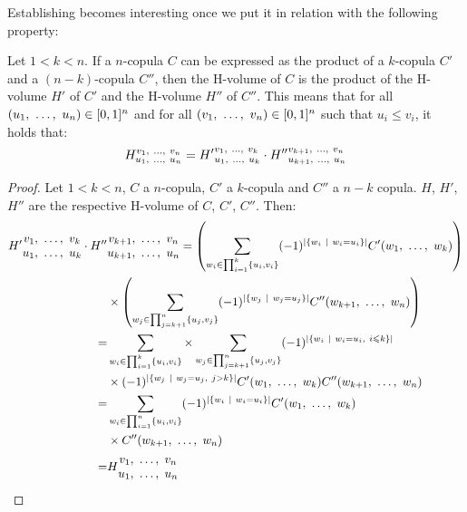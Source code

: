 Establishing  becomes interesting once we put it in relation with the following property:
\begin{proposition}\label{prop:hvol_factorizing}
    Let $1<k<n$. If a $n$-copula $C$ can be expressed as the product of a $k$-copula $C'$ and a $(n-k)$-copula $C''$, then the H-volume of $C$ is the product of the H-volume $H'$ of $C'$ and the H-volume $H''$ of $C''$. This means that for all $(u_1 , ~\ldots, ~ u_n)\in[0,1]^n$ and for all $(v_1 , ~\ldots, ~ v_n)\in[0,1]^n$ such that $u_i\leqslant v_i$, it holds that:
    \begin{align}
        H_{u_1 , ~\ldots, ~ u_n}^{v_1 , ~\ldots, ~ v_n} = {H'}_{u_1 , ~\ldots, ~ u_k}^{v_1 , ~\ldots, ~ v_k}\cdot{H''}_{u_{k+1} , ~\ldots, ~ u_n}^{v_{k+1} , ~\ldots, ~ v_n}
    \end{align}
\end{proposition}
\begin{proof}
    Let $1<k<n$, $C$ a $n$-copula, $C'$ a $k$-copula and $C''$ a $n-k$ copula. $H$, $H'$, $H''$ are the respective H-volume of $C$, $C'$, $C''$. Then:
    \begin{align*}
        {H'}
        \begin{matrix}
            v_1 , ~\ldots, ~  v_k\\
            u_1 , ~\ldots, ~  u_k
        \end{matrix}
        \cdot {H''}&
        \begin{matrix}
            v_{k+1} , ~\ldots, ~  v_n\\
            u_{k+1} , ~\ldots, ~  u_n
        \end{matrix}= \left(\sum_{w_i\in\prod_{i=1}^{k}\{u_i,v_i\}}(-1)^{|\{w_i~|~w_i=u_i\}|}C'(w_1 , ~\ldots, ~ w_k)\right)\\
        &\times\left(\sum_{w_j\in\prod_{j=k+1}^{n}\{u_j,v_j\}}(-1)^{|\{w_j~|~w_j=u_j\}|}C''(w_{k+1} , ~\ldots, ~ w_n)\right)\\
        =& \sum_{w_i\in\prod_{i=1}^{k}\{u_i,v_i\}}\times\sum_{w_j\in\prod_{j=k+1}^{n}\{u_j,v_j\}}(-1)^{|\{w_i~|~w_i=u_i,~i\leqslant k\}|}\\
        &\times(-1)^{|\{w_j~|~w_j=u_j,~ j>k\}|}C'(w_1 , ~\ldots, ~ w_k)C''(w_{k+1} , ~\ldots, ~ w_n)\\
        =&\sum_{w_i\in\prod_{i=1}^{n}\{u_i,v_i\}}(-1)^{|\{w_i~|~w_i=u_i\}|}C'(w_1 , ~\ldots, ~ w_k)\\
        &\times C''(w_{k+1} , ~\ldots, ~ w_n)\\
        =&H
        \begin{matrix}
            v_1 , ~\ldots, ~  v_n\\
            u_1 , ~\ldots, ~  u_n
        \end{matrix}
    \end{align*}
\end{proof}
